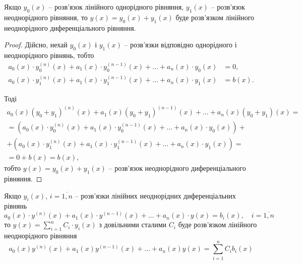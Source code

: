 \begin{property}
	\label{prop:3.3.1}
	Якщо $y_0(x)$ -- розв’язок лінійного однорідного рівняння, $y_1(x)$ -- розв’язок неоднорідного рівняння, то $y(x) = y_0(x) + y_1(x)$ буде розв’язком лінійного неоднорідного диференціального рівняння.
\end{property}

\begin{proof}
	Дійсно, нехай $y_0(x)$ і $y_1(x)$ -- розв’язки відповідно однорідного і неоднорідного рівнянь, тобто
	\begin{align*}
		a_0(x) \cdot y_0^{(n)}(x) + a_1(x) \cdot y_0^{(n - 1)}(x) + \ldots + a_n(x) \cdot y_0(x) &= 0, \\
		a_0(x) \cdot y_1^{(n)}(x) + a_1(x) \cdot y_1^{(n - 1)}(x) + \ldots + a_n(x) \cdot y_1(x) &= b(x).
	\end{align*}	
	
	Тоді 
	\begin{multline*}
		a_0(x) (y_0 + y_1)^{(n)}(x) + a_1(x) (y_0 + y_1)^{(n - 1)}(x) + \ldots + a_n(x) (y_0 + y_1)(x) = \\ = \left( a_0(x) \cdot y_0^{(n)}(x) + a_1(x) \cdot y_0^{(n - 1)}(x) + \ldots + a_n(x) \cdot y_0(x) \right) + \\ + \left( a_0(x) \cdot y_1^{(n)}(x) + a_1(x) \cdot y_1^{(n - 1)}(x) + \ldots + a_n(x) \cdot y_1(x) \right) = \\ = 0 + b(x) = b(x),
	\end{multline*}
	тобто $y(x) = y_0(x) + y_1(x)$ -- розв’язок неоднорідного диференціального рівняння.
\end{proof}

\begin{property}
	Якщо $y_i(x)$, $i = \overline{1, n}$ -- розв’язки лінійних неоднорідних диференціальних рівнянь
	\begin{equation*}
		a_0(x) \cdot y^{(n)}(x) + a_1(x) \cdot y^{(n - 1)}(x) + \ldots + a_n(x) \cdot y(x) = b_i(x), \quad i = \overline{1, n}
	\end{equation*}
	то $y(x) = \sum_{i = 1}^n C_i \cdot y_i(x)$ з довільними сталими $C_i$ буде розв’язком лінійного неоднорідного рівняння
	\begin{equation*}
		a_0(x) y^{(n)}(x) + a_1(x) y^{(n - 1)}(x) + \ldots + a_n(x) y(x) = \sum_{i = 1}^n C_i  b_i(x)
	\end{equation*}
\end{property}

